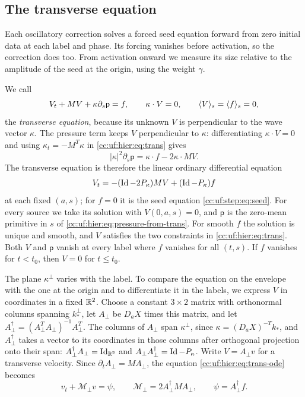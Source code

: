\subsection{The transverse equation}\label{cc:uf:sec:transverse}
Each oscillatory correction solves a forced seed equation forward from
zero initial data at each label and phase. Its forcing vanishes before
activation, so the correction does too. From activation onward we measure
its size relative to the amplitude of the seed at the origin, using the
weight $\gamma$.

We call
\begin{equation}\label{cc:uf:hier:eq:trans}
 V_t+MV+\kappa\partial_s\mathsf p=f,\qquad
 \kappa\cdot V=0,\qquad \langle V\rangle_s=\langle f\rangle_s=0,
\end{equation}
the \emph{transverse equation}, because its unknown $V$ is perpendicular
to the wave vector $\kappa$. The pressure term keeps $V$
perpendicular to $\kappa$: differentiating $\kappa\cdot V=0$
and using $\kappa_t=-M^T\kappa$ in \eqref{cc:uf:hier:eq:trans} gives
\begin{equation}\label{cc:uf:hier:eq:pressure-from-trans}
 |\kappa|^2\partial_s\mathsf p=\kappa\cdot f-2\kappa\cdot MV.
\end{equation}
The transverse equation is therefore the linear ordinary differential
equation
\begin{equation}\label{cc:uf:hier:eq:trans-ode}
 V_t=-(\operatorname{Id}-2P_\kappa)MV+(\operatorname{Id}-P_\kappa)f
\end{equation}
at each fixed $(a,s)$; for $f=0$ it is the seed equation
\eqref{cc:uf:step:eq:seed}. For
every source we take its solution with $V(0,a,s)=0$, and $\mathsf p$ is
the zero-mean primitive in $s$ of
\eqref{cc:uf:hier:eq:pressure-from-trans}. For smooth $f$ the solution
is unique and smooth, and $V$ satisfies the two constraints in
\eqref{cc:uf:hier:eq:trans}. Both $V$ and $\mathsf p$ vanish at every
label where $f$ vanishes for all $(t,s)$. If $f$ vanishes for $t<t_0$,
then $V=0$ for $t\le t_0$.

The plane $\kappa^\perp$ varies with the label. To compare the equation
on the envelope with the one at the origin and to differentiate it in
the labels, we express $V$ in coordinates in a fixed $\mathbb R^2$.
Choose a constant $3\times2$ matrix with orthonormal columns spanning
$k_*^\perp$, let $A_\perp$ be $D_aX$ times this matrix, and let
$A_\perp^\dagger=(A_\perp^TA_\perp)^{-1}A_\perp^T$.
The columns of $A_\perp$ span $\kappa^\perp$, since
$\kappa=(D_aX)^{-T}k_*$, and $A_\perp^\dagger$ takes a vector to its
coordinates in those columns after orthogonal projection onto their
span: $A_\perp^\dagger A_\perp=\operatorname{Id}_{\mathbb R^2}$ and
$A_\perp A_\perp^\dagger=\operatorname{Id}-P_\kappa$. Write $V=A_\perp v$ for a
transverse velocity. Since $\partial_tA_\perp=MA_\perp$, the equation
\eqref{cc:uf:hier:eq:trans-ode} becomes
\begin{equation}\label{cc:uf:tower:eq:coordinate}
 v_t+\mathcal M_\perp v=\psi,\qquad
 \mathcal M_\perp=2A_\perp^\dagger MA_\perp,\qquad
 \psi=A_\perp^\dagger f.
\end{equation}

